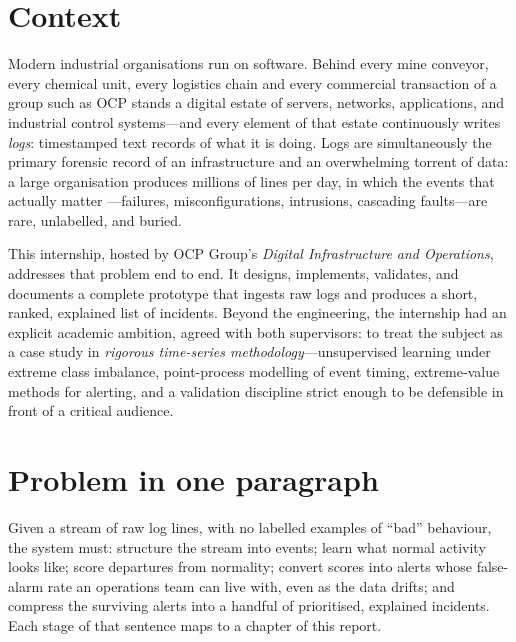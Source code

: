 \documentclass[11pt,a4paper]{report}
\begin{document}
\section{Context}
Modern industrial organisations run on software. Behind every mine
conveyor, every chemical unit, every logistics chain and every commercial
transaction of a group such as OCP stands a digital estate of servers,
networks, applications, and industrial control systems---and every element of
that estate continuously writes \emph{logs}: timestamped text records of what
it is doing. Logs are simultaneously the primary forensic record of an
infrastructure and an overwhelming torrent of data: a large organisation
produces millions of lines per day, in which the events that actually matter
---failures, misconfigurations, intrusions, cascading faults---are rare,
unlabelled, and buried.

This internship, hosted by OCP Group's \emph{Digital Infrastructure and
Operations}, addresses that problem end to end. It designs, implements,
validates, and documents a complete prototype that ingests raw logs and
produces a short, ranked, explained list of incidents. Beyond the
engineering, the internship had an explicit academic ambition, agreed with
both supervisors: to treat the subject as a case study in \emph{rigorous
time-series methodology}---unsupervised learning under extreme class
imbalance, point-process modelling of event timing, extreme-value methods
for alerting, and a validation discipline strict enough to be defensible in
front of a critical audience.

\section{Problem in one paragraph}
Given a stream of raw log lines, with no labelled examples of ``bad''
behaviour, the system must: structure the stream into events; learn what
normal activity looks like; score departures from normality; convert scores
into alerts whose false-alarm rate an operations team can live with, even as
the data drifts; and compress the surviving alerts into a handful of
prioritised, explained incidents. Each stage of that sentence maps to a
chapter of this report.
\end{document}
